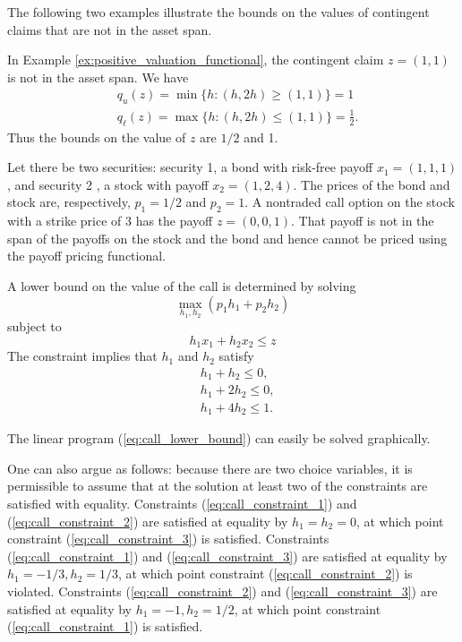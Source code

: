 \documentclass[\topdir/lecture\_notes.tex]{subfiles}
\begin{document}
\begin{optional}
The following two examples illustrate the bounds on the values of contingent claims that are not in the asset span.

\begin{example}\label{ex:call_option_bounds_simple}
In Example \ref{ex:positive_valuation_functional}, the contingent claim \(z=(1,1)\) is not in the asset span. We have
\begin{align}
& q_{u}(z)=\min \{h:(h, 2 h) \geq(1,1)\}=1 \label{4.7}\\
& q_{\ell}(z)=\max \{h:(h, 2 h) \leq(1,1)\}=\frac{1}{2} . \label{4.8}
\end{align}
Thus the bounds on the value of \(z\) are \(1 / 2\) and 1.
\end{example}
\begin{example}\label{ex:call_option_bounds_detailed}
Let there be two securities: security 1, a bond with risk-free payoff \(x_{1}=(1,1,1)\), and security 2 , a stock with payoff \(x_{2}=(1,2,4)\). The prices of the bond and stock are, respectively, \(p_{1}=1 / 2\) and \(p_{2}=1\). A nontraded call option on the stock with a strike price of 3 has the payoff \(z=(0,0,1)\). That payoff is not in the span of the payoffs on the stock and the bond and hence cannot be priced using the payoff pricing functional.

A lower bound on the value of the call is determined by solving
\begin{equation}
\max _{h_{1}, h_{2}}\left(p_{1} h_{1}+p_{2} h_{2}\right) \label{eq:call_lower_bound}
\end{equation}
subject to
\begin{equation*}
h_{1} x_{1}+h_{2} x_{2} \leq z 
\end{equation*}
The constraint implies that \(h_{1}\) and \(h_{2}\) satisfy
\begin{align}
& h_{1}+h_{2} \leq 0, \label{eq:call_constraint_1}\\
& h_{1}+2 h_{2} \leq 0, \label{eq:call_constraint_2}\\
& h_{1}+4 h_{2} \leq 1 . \label{eq:call_constraint_3}
\end{align}

The linear program (\ref{eq:call_lower_bound}) can easily be solved graphically.

One can also argue as follows: because there are two choice variables, it is permissible to assume that at the solution at least two of the constraints are satisfied with equality. Constraints (\ref{eq:call_constraint_1}) and (\ref{eq:call_constraint_2}) are satisfied at equality by \(h_{1}=h_{2}=0\), at which point constraint (\ref{eq:call_constraint_3}) is satisfied. Constraints (\ref{eq:call_constraint_1}) and (\ref{eq:call_constraint_3}) are satisfied at equality by \(h_{1}=-1 / 3, h_{2}=1 / 3\), at which point constraint (\ref{eq:call_constraint_2}) is violated. Constraints (\ref{eq:call_constraint_2}) and (\ref{eq:call_constraint_3}) are satisfied at equality by \(h_{1}=-1, h_{2}=1 / 2\), at which point constraint (\ref{eq:call_constraint_1}) is satisfied.


\end{example}
\end{optional}
\end{document}
